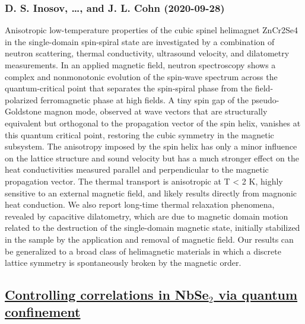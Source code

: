 \subsubsection*{D. S. Inosov, \dots, and J. L. Cohn (2020-09-28)}
Anisotropic low-temperature properties of the cubic spinel helimagnet
ZnCr2Se4 in the single-domain spin-spiral state are investigated by a
combination of neutron scattering, thermal conductivity, ultrasound velocity,
and dilatometry measurements. In an applied magnetic field, neutron
spectroscopy shows a complex and nonmonotonic evolution of the spin-wave
spectrum across the quantum-critical point that separates the spin-spiral phase
from the field-polarized ferromagnetic phase at high fields. A tiny spin gap of
the pseudo-Goldstone magnon mode, observed at wave vectors that are
structurally equivalent but orthogonal to the propagation vector of the spin
helix, vanishes at this quantum critical point, restoring the cubic symmetry in
the magnetic subsystem. The anisotropy imposed by the spin helix has only a
minor influence on the lattice structure and sound velocity but has a much
stronger effect on the heat conductivities measured parallel and perpendicular
to the magnetic propagation vector. The thermal transport is anisotropic at T <
2 K, highly sensitive to an external magnetic field, and likely results
directly from magnonic heat conduction. We also report long-time thermal
relaxation phenomena, revealed by capacitive dilatometry, which are due to
magnetic domain motion related to the destruction of the single-domain magnetic
state, initially stabilized in the sample by the application and removal of
magnetic field. Our results can be generalized to a broad class of helimagnetic
materials in which a discrete lattice symmetry is spontaneously broken by the
magnetic order.

\subsection*{\href{http://arxiv.org/abs/2009.13422v1}{Controlling correlations in NbSe$_2$ via quantum confinement}}
